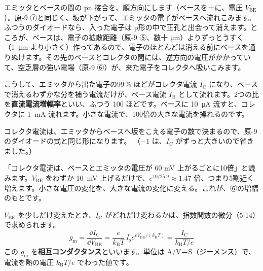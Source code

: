 エミッタとベースの間の pn 接合を、順方向にします（ベースを＋に、電圧 $V_{\mathrm{BE}}$）。原-9 ⑦と同じく、坂が下がって、エミッタの電子がベースへ流れこみます。ふつうのダイオードなら、入った電子は p形の中で正孔と出会って消えます。ところが、ベースは、電子の拡散距離（原-9 ⑤、数十 \si{\micro m}）よりずっとうすく（\qty{1}{\micro m} より小さく）作ってあるので、電子のほとんどは消える前にベースを通りぬけます。その先のベースとコレクタの間には、逆方向の電圧がかかっていて、空乏層の強い電場（原-9 ⑥）が、来た電子をコレクタへ吸いこみます。

こうして、エミッタから出た電子の99\,\% ほどがコレクタ電流 $I_{\mathrm C}$ になり、ベースで消えるわずかな分を補う電流だけが、ベース電流 $I_{\mathrm B}$ として流れます。2つの比
\label{ph:原-10:hfe}を\textbf{直流電流増幅率}といい、ふつう 100 ほどです。ベースに \qty{10}{\micro A} 流すと、コレクタに \qty{1}{mA} 流れます。小さな電流で、100倍の大きな電流を操れるのです。

コレクタ電流は、エミッタからベースへ坂をこえる電子の数で決まるので、原-9 のダイオードの式と同じ形になります。
\label{ph:原-10:ic}（$-1$ は、$I_{\mathrm C}$ がずっと大きいので省きました。）

\begin{phyomi}[$I_{\mathrm C}=I_{\mathrm s}e^{eV_{\mathrm{BE}}/(k_{\mathrm B}T)}$]
「コレクタ電流は、ベースとエミッタの電圧が 60 mV 上がるごとに10倍」と読みます。$V_{\mathrm{BE}}$ をわずか \qty{10}{mV} 上げるだけで、$e^{10/25.9}\approx1.47$ 倍、つまり5割近く増えます。小さな電圧の変化を、大きな電流の変化に変える。これが、⑥の増幅のもとです。
\end{phyomi}

$V_{\mathrm{BE}}$ を少しだけ変えたとき、$I_{\mathrm C}$ がどれだけ変わるかは、指数関数の微分（5-14）で求められます。
\[ g_{\mathrm m}=\frac{\dd I_{\mathrm C}}{\dd V_{\mathrm{BE}}}=\frac{e}{k_{\mathrm B}T}\,I_{\mathrm s}e^{eV_{\mathrm{BE}}/(k_{\mathrm B}T)}=\frac{I_{\mathrm C}}{k_{\mathrm B}T/e} \]
この $g_{\mathrm m}$ を\textbf{相互コンダクタンス}といいます。単位は A/V＝S（ジーメンス）で、電流を熱の電圧 $k_{\mathrm B}T/e$ でわった値です。\label{ph:原-10:gm}

